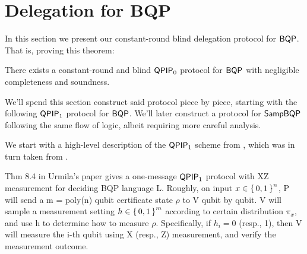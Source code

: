 \section{Delegation for BQP}
\label{sec:BlindBQP}






In this section we present our constant-round blind delegation protocol for $\operatorname{\mathsf{BQP}}$. That is, proving this theorem:
\begin{thm}
	\label{thm:QPIP0BQP}
	There exists a constant-round and blind $\operatorname{\mathsf{QPIP}}_0$ protocol for $\operatorname{\mathsf{BQP}}$ with negligible completeness and soundness.
\end{thm}
We'll spend this section construct said protocol piece by piece, starting with the following $\operatorname{\mathsf{QPIP}}_1$ protocol for $\operatorname{\mathsf{BQP}}$.
We'll later construct a protocol for $\operatorname{\mathsf{SampBQP}}$ following the same flow of logic, albeit requiring more careful analysis.

We start with a high-level description of the $\operatorname{\mathsf{QPIP}}_1$ scheme from \cite{mahadev_delegation}, which was in turn taken from \cite{mf16}.

Thm 8.4 in Urmila's paper gives a one-message $\operatorname{\mathsf{QPIP}}_1$ protocol with XZ measurement for deciding BQP language L.
Roughly, on input $x \in\set{0,1}^n$,  P will send a m = poly(n) qubit certificate state $\rho$ to V qubit by qubit.
V will sample a measurement setting $h \in \set{0,1}^m$ according to certain distribution $\pi_x$, and use h to determine how to measure $\rho$.
Specifically, if $h_i = 0$ (resp., 1), then V will measure the i-th qubit using  X (resp., Z) measurement, and verify the measurement outcome.

